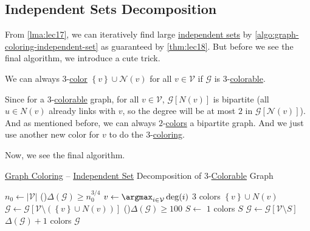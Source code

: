 \subsection{Independent Sets Decomposition}
From \autoref{lma:lec17}, we can iteratively find large \hyperref[def:independent-set]{independent sets} by \autoref{algo:graph-coloring-independent-set} as guaranteed by \autoref{thm:lec18}. But before we see the final algorithm, we introduce a cute trick.

\begin{remark}\label{rmk:Wigderson-trick}
	We can always \(3\)-\hyperref[def:coloring]{color} \(\left\{ v \right\} \cup \mathcal{N} (v)\) for all \(v\in \mathcal{V} \) if \(\mathcal{G} \) is \(3\)-\hyperref[def:coloring]{colorable}.
\end{remark}
\begin{explanation}
	Since for a \(3\)-\hyperref[def:coloring]{colorable} graph, for all \(v\in \mathcal{V} \), \(\mathcal{G} [N(v)]\) is bipartite (all \(u\in N(v)\) already links with \(v\), so the degree will be at most \(2\) in \(\mathcal{G} [\mathcal{N} (v)]\)). And as mentioned before, we can always \(2\)-\hyperref[def:coloring]{colors} a bipartite graph. And we just use another new color for \(v\) to do the \(3\)-\hyperref[def:coloring]{coloring}.
\end{explanation}

Now, we see the final algorithm.

\begin{algorithm}[H]\label{algo:graph-coloring}
	\DontPrintSemicolon
	\caption{\hyperref[prb:graph-coloring]{Graph Coloring} -- \hyperref[def:independent-set]{Independent Set} Decomposition of \(3\)-\hyperref[def:coloring]{Colorable} Graph}
	\BlankLine
	\(n_0\gets \left\vert \mathcal{V}  \right\vert \)\;
	\;
	\While(\label{algo:graph-coloring-phase-1}){\(\Delta (\mathcal{G} ) \geq n_0 ^{3 / 4}\)}{
	\(v\gets \argmax_{i\in \mathcal{V} } \deg(i)\)\;
	\(3\) colors \(\left\{ v \right\} \cup N(v)\)
	\(\mathcal{G} \gets \mathcal{G} [\mathcal{V} \setminus (\left\{ v \right\} \cup N(v))]\)\;
	}
	\;
	\While(\label{algo:graph-coloring-phase-2}){\(\Delta (\mathcal{G} ) \geq 100\)}{
		\(S\gets\)
		\(1\) colors \(S\)\;
		\(\mathcal{G} \gets \mathcal{G} [\mathcal{V} \setminus S]\)\;
	}
	\;
	\(\Delta (\mathcal{G} ) + 1\) colors \(\mathcal{G} \)\label{algo:graph-coloring-phase-3}
	\;
\end{algorithm}

